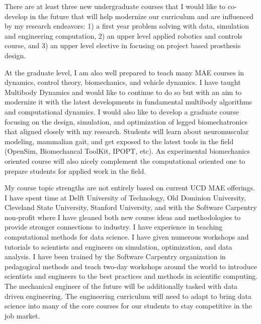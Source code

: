 \documentclass{article}
\begin{document}
There are at least three new undergraduate courses that I would like to
co-develop in the future that will help modernize our curriculum and are
influenced by my research endeavors: 1) a first year problem solving with data,
simulation and engineering computation, 2) an upper level applied robotics and
controls course, and 3) an upper level elective in focusing on project based
prosthesis design.

At the graduate level, I am also well prepared to teach many MAE courses in
dynamics, control theory, biomechanics, and vehicle dynamics. I have taught
Multibody Dynamics and would like to continue to do so but with an aim to
modernize it with the latest developments in fundamental multibody algorithms
and computational dynamics. I would also like to develop a graduate course
focusing on the design, simulation, and optimization of legged biomechatronics
that aligned closely with my research.  Students will learn about neuromuscular
modeling, mammalian gait, and get exposed to the latest tools in the field
(OpenSim, Biomechancal ToolKit, IPOPT, etc). An experimental biomechanics
oriented course will also nicely complement the computational oriented one to
prepare students for applied work in the field.

My course topic strengths are not entirely based on current UCD MAE offerings.
I have spent time at Delft University of Technology, Old Dominion University,
Cleveland State University, Stanford University, and with the Software
Carpentry non-profit where I have gleaned both new course ideas and
methodologies to provide stronger connections to industry. I have experience in
teaching computational methods for data science. I have given numerous
workshops and tutorials to scientists and engineers on simulation,
optimization, and data analysis. I have been trained by the Software Carpentry
organization in pedagogical methods and teach two-day workshops around the
world to introduce scientists and engineers to the best practices and methods
in scientific computing. The mechanical engineer of the future will be
additionally tasked with data driven engineering. The engineering curriculum
will need to adapt to bring data science into many of the core courses for our
students to stay competitive in the job market.
\end{document}

